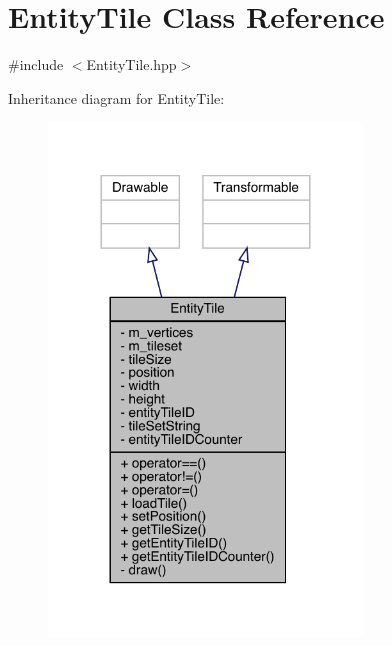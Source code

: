 \hypertarget{class_entity_tile}{}\section{Entity\+Tile Class Reference}
\label{class_entity_tile}


{\ttfamily \#include $<$Entity\+Tile.\+hpp$>$}



Inheritance diagram for Entity\+Tile\+:
\nopagebreak
\begin{figure}[H]
\begin{center}
\leavevmode
\includegraphics[width=236pt]{class_entity_tile__inherit__graph}
\end{center}
\end{figure}


